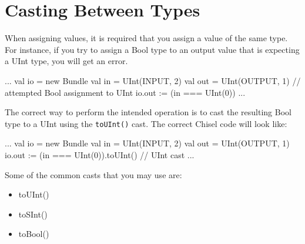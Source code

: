 \section{Casting Between Types}

When assigning values, it is required that you assign a value of the same type. For instance, if you try to assign a Bool type to an output value that is expecting a UInt type, you will get an error.

\begin{scala}
  ...
  val io  = new Bundle {
    val in  = UInt(INPUT, 2)
    val out = UInt(OUTPUT, 1)
  }
  // attempted Bool assignment to UInt
  io.out := (in === UInt(0)) 
  ...
\end{scala}

The correct way to perform the intended operation is to cast the resulting Bool type to a UInt using the \verb+toUInt()+ cast. The correct Chisel code will look like:

\begin{scala}
  ...
  val io = new Bundle {
    val in  = UInt(INPUT, 2)
    val out = UInt(OUTPUT, 1)
  }
  io.out := (in === UInt(0)).toUInt() // UInt cast
  ...
\end{scala}

Some of the common casts that you may use are:

\begin{itemize}
\item toUInt()
\item toSInt()
\item toBool()
\end{itemize}
